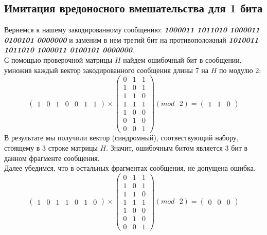 \documentclass[a5paper, 10pt]{article}
\theoremstyle{definition}
\theoremstyle{plain}
\theoremstyle{remark}
\begin{document}
\subsection{Имитация вредоносного вмешательства для 1 бита}
Вернемся к нашему закодированному сообщению:  \textbf{\textit{10\colorbox[rgb]{0.50, 0.5, 0.5}{0}0011 1011010 1000011 0100101 0000000}} и заменим в нем третий бит на противоположный  \textbf{\textit{10\colorbox[rgb]{0.4, 0.8, 0.8}{1}0011 1011010 1000011 0100101 0000000}}.\\
С помощью проверочной матрицы $H$ найдем ошибочный бит в сообщении, умножив каждый вектор закодированного сообщения длины 7 на $H$ по модулю 2:
\begin{equation}
\begin{pmatrix}
1 & 0 & 1 & 0 & 0 & 1 & 1
\end{pmatrix}
 \times
\begin{pmatrix}
0 & 1 & 1\\
1 & 0 & 1\\
1 & 1 & 0\\
1 & 1 & 1 \\
1 & 0 & 0\\
0 & 1 & 0 \\
0 & 0 & 1
\end{pmatrix}
(mod \text{ }2)
= \begin{pmatrix}
1 & 1 & 0 
\end{pmatrix}
\end{equation}
В результате мы получили вектор (синдромный), соотвествующий набору, стоящему в 3 строке матрицы $H$. Значит, ошибочным битом является 3 бит в данном фрагменте сообщения.\\
Далее убедимся, что в остальных фрагментах сообщения, не допущена ошибка.
\begin{equation}
\begin{pmatrix}
1 & 0 & 1 & 1 & 0 & 1 & 0
\end{pmatrix}
 \times
\begin{pmatrix}
0 & 1 & 1\\
1 & 0 & 1\\
1 & 1 & 0\\
1 & 1 & 1 \\
1 & 0 & 0\\
0 & 1 & 0 \\
0 & 0 & 1
\end{pmatrix}
(mod \text{ }2)
= \begin{pmatrix}
0 & 0 & 0 
\end{pmatrix}
\end{equation}
\end{document}
